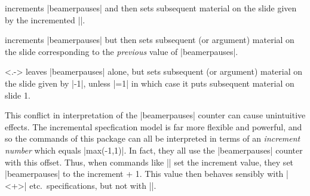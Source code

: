 \documentclass[a4paper]{ltxdoc}
\begin{document}
\begin{command}{\pause}
  increments |beamerpauses| and then sets subsequent material on the slide
  given by the incremented |\value{beamerpauses}|. 
\end{command}

\begin{command}{\onslide<+->}
  increments |beamerpauses| but then sets subsequent (or argument) material on
  the slide corresponding to the \emph{previous} value of |beamerpauses|.
\end{command}

\begin{command}{\onslide<.->}
  leaves |beamerpauses| alone, but sets subsequent (or argument) material on the
  slide given by |\value{beamerpauses}-1|, unless |\value{beamerpauses}=1| in
  which case it puts subsequent material on slide 1.
\end{command}

This conflict in interpretation of the |beamerpauses| counter can cause
unintuitive effects.  The incremental specfication model is far more flexible
and powerful, and so the commands of this package can all be interpreted in
terms of an \emph{increment number} which equals
|max(\value{beamerpauses}-1,1)|.  In fact, they all use the |beamerpauses|
counter with this offset.  Thus, when commands like |\resetincr| set the
increment value, they set |beamerpauses| to the increment + 1.  This value then
behaves sensibly with |<+>| etc.\ specifications, but not with |\pause|.  





%




%  
% 
\end{document}
